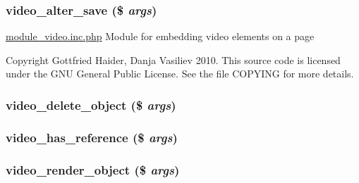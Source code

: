 \hypertarget{module__video_8inc_8php_0e3433d55c8d20b28c95a757740982e1}{
\subsubsection[{video\_\-alter\_\-save}]{\setlength{\rightskip}{0pt plus 5cm}video\_\-alter\_\-save (\$ {\em args})}}
\label{module__video_8inc_8php_0e3433d55c8d20b28c95a757740982e1}


\hyperlink{module__video_8inc_8php}{module\_\-video.inc.php} Module for embedding video elements on a page

Copyright Gottfried Haider, Danja Vasiliev 2010. This source code is licensed under the GNU General Public License. See the file COPYING for more details. \hypertarget{module__video_8inc_8php_4d25a132251840ed2ade27b636a6694e}{
\subsubsection[{video\_\-delete\_\-object}]{\setlength{\rightskip}{0pt plus 5cm}video\_\-delete\_\-object (\$ {\em args})}}
\label{module__video_8inc_8php_4d25a132251840ed2ade27b636a6694e}


\hypertarget{module__video_8inc_8php_dbbede5e492ca7b9457deaf076c887b0}{
\subsubsection[{video\_\-has\_\-reference}]{\setlength{\rightskip}{0pt plus 5cm}video\_\-has\_\-reference (\$ {\em args})}}
\label{module__video_8inc_8php_dbbede5e492ca7b9457deaf076c887b0}


\hypertarget{module__video_8inc_8php_14d6bc200a41905ad201a24d9a2d9be5}{
\subsubsection[{video\_\-render\_\-object}]{\setlength{\rightskip}{0pt plus 5cm}video\_\-render\_\-object (\$ {\em args})}}
\label{module__video_8inc_8php_14d6bc200a41905ad201a24d9a2d9be5}


